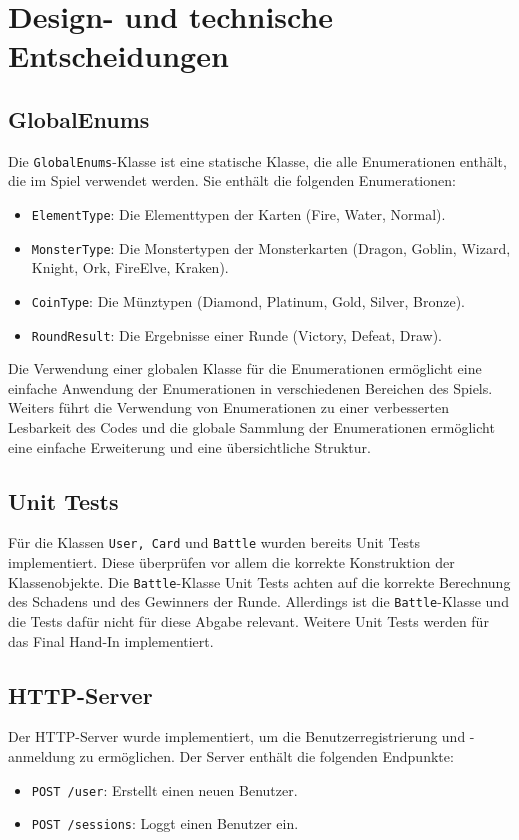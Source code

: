 \documentclass[a4paper, 12pt]{article}
\begin{document}
\section{Design- und technische Entscheidungen}
\subsection{GlobalEnums}
Die \texttt{GlobalEnums}-Klasse ist eine statische Klasse, die alle Enumerationen enthält, die im Spiel verwendet werden. Sie enthält die folgenden Enumerationen:
\begin{itemize}
    \item \texttt{ElementType}: Die Elementtypen der Karten (Fire, Water, Normal).
    \item \texttt{MonsterType}: Die Monstertypen der Monsterkarten (Dragon, Goblin, Wizard, Knight, Ork, FireElve, Kraken).
    \item \texttt{CoinType}: Die Münztypen (Diamond, Platinum, Gold, Silver, Bronze).
    \item \texttt{RoundResult}: Die Ergebnisse einer Runde (Victory, Defeat, Draw).
\end{itemize}
Die Verwendung einer globalen Klasse für die Enumerationen ermöglicht eine einfache Anwendung der Enumerationen in verschiedenen Bereichen des Spiels.
Weiters führt die Verwendung von Enumerationen zu einer verbesserten Lesbarkeit des Codes und die globale Sammlung der Enumerationen ermöglicht eine einfache Erweiterung und eine übersichtliche Struktur.

\subsection{Unit Tests}
Für die Klassen \texttt{User, Card} und \texttt{Battle} wurden bereits Unit Tests implementiert.
Diese überprüfen vor allem die korrekte Konstruktion der Klassenobjekte.
Die \texttt{Battle}-Klasse Unit Tests achten auf die korrekte Berechnung des Schadens und des Gewinners der Runde. Allerdings ist die \texttt{Battle}-Klasse und die Tests dafür nicht für diese Abgabe relevant.
Weitere Unit Tests werden für das Final Hand-In implementiert.


\subsection{HTTP-Server}
Der HTTP-Server wurde implementiert, um die Benutzerregistrierung und -anmeldung zu ermöglichen. Der Server enthält die folgenden Endpunkte:
\begin{itemize}
    \item \texttt{POST /user}: Erstellt einen neuen Benutzer.
    \item \texttt{POST /sessions}: Loggt einen Benutzer ein.
\end{itemize}
\end{document}
